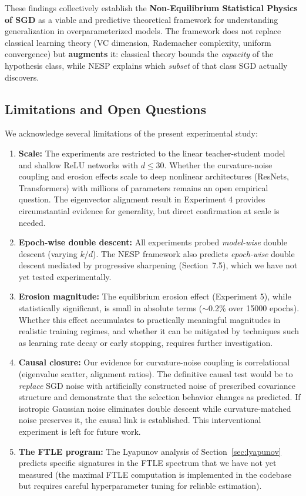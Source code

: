 \documentclass[
  journal=largetwo,
  year=2025,
  volume=37,
]{cup-journal}
\begin{document}
These findings collectively establish the \textbf{Non-Equilibrium Statistical Physics of SGD} as a viable and predictive theoretical framework for understanding generalization in overparameterized models. The framework does not replace classical learning theory (VC dimension, Rademacher complexity, uniform convergence) but \textbf{augments} it: classical theory bounds the \textit{capacity} of the hypothesis class, while NESP explains which \textit{subset} of that class SGD actually discovers.

\subsection{Limitations and Open Questions}

We acknowledge several limitations of the present experimental study:

\begin{enumerate}
    \item \textbf{Scale:} The experiments are restricted to the linear teacher-student model and shallow ReLU networks with $d \leq 30$. Whether the curvature-noise coupling and erosion effects scale to deep nonlinear architectures (ResNets, Transformers) with millions of parameters remains an open empirical question. The eigenvector alignment result in Experiment 4 provides circumstantial evidence for generality, but direct confirmation at scale is needed.

    \item \textbf{Epoch-wise double descent:} All experiments probed \textit{model-wise} double descent (varying $k/d$). The NESP framework also predicts \textit{epoch-wise} double descent mediated by progressive sharpening (Section~7.5), which we have not yet tested experimentally.

    \item \textbf{Erosion magnitude:} The equilibrium erosion effect (Experiment 5), while statistically significant, is small in absolute terms ($\sim$0.2\% over 15000 epochs). Whether this effect accumulates to practically meaningful magnitudes in realistic training regimes, and whether it can be mitigated by techniques such as learning rate decay or early stopping, requires further investigation.

    \item \textbf{Causal closure:} Our evidence for curvature-noise coupling is correlational (eigenvalue scatter, alignment ratios). The definitive causal test would be to \textit{replace} SGD noise with artificially constructed noise of prescribed covariance structure and demonstrate that the selection behavior changes as predicted. If isotropic Gaussian noise eliminates double descent while curvature-matched noise preserves it, the causal link is established. This interventional experiment is left for future work.

    \item \textbf{The FTLE program:} The Lyapunov analysis of Section~\ref{sec:lyapunov} predicts specific signatures in the FTLE spectrum that we have not yet measured (the maximal FTLE computation is implemented in the codebase but requires careful hyperparameter tuning for reliable estimation).
\end{enumerate}
\end{document}
